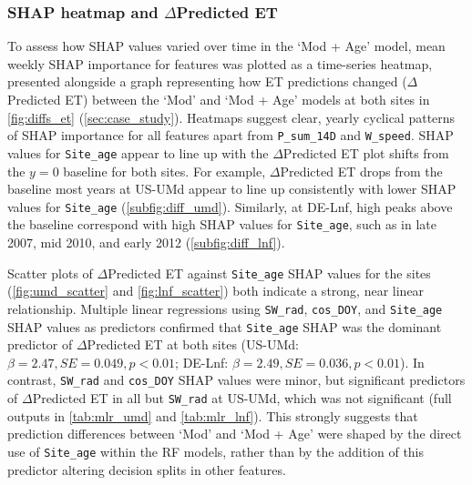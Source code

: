 \subsubsection{SHAP heatmap and $\Delta$Predicted \ac{ET}} \label{case:3}
\par To assess how \ac{SHAP} values varied over time in the `Mod + Age' model, mean weekly \ac{SHAP} importance for features was plotted as a time-series heatmap, presented alongside a graph representing how \ac{ET} predictions changed ($\Delta$Predicted \ac{ET}) between the `Mod' and `Mod + Age' models at both sites in \autoref{fig:diffs_et} (\ref{sec:case_study}). Heatmaps suggest clear, yearly cyclical patterns of \ac{SHAP} importance for all features apart from \texttt{P\_sum\_14D} and \texttt{W\_speed}. \ac{SHAP} values for \texttt{Site\_age} appear to line up with the $\Delta$Predicted \ac{ET} plot shifts from the $y = 0$ baseline for both sites. For example, $\Delta$Predicted \ac{ET} drops from the baseline most years at US-UMd appear to line up consistently with lower \ac{SHAP} values for \texttt{Site\_age} (\autoref{subfig:diff_umd}). Similarly, at DE-Lnf, high peaks above the baseline correspond with high \ac{SHAP} values for \texttt{Site\_age}, such as in late 2007, mid 2010, and early 2012 (\autoref{subfig:diff_lnf}).
\par Scatter plots of $\Delta$Predicted \ac{ET} against \texttt{Site\_age} \ac{SHAP} values for the sites (\autoref{fig:umd_scatter} and \autoref{fig:lnf_scatter}) both indicate a strong, near linear relationship. Multiple linear regressions using \texttt{SW\_rad}, \texttt{cos\_DOY}, and \texttt{Site\_age} \ac{SHAP} values as predictors confirmed that \texttt{Site\_age} \ac{SHAP} was the dominant predictor of $\Delta$Predicted \ac{ET} at both sites (US-UMd: $\beta = 2.47, SE = 0.049, p < 0.01$; DE-Lnf: $\beta = 2.49, SE = 0.036, p < 0.01$). In contrast, \texttt{SW\_rad} and \texttt{cos\_DOY} \ac{SHAP} values were minor, but significant predictors of $\Delta$Predicted \ac{ET} in all but \texttt{SW\_rad} at US-UMd, which was not significant (full outputs in \autoref{tab:mlr_umd} and \autoref{tab:mlr_lnf}). This strongly suggests that prediction differences between `Mod' and `Mod + Age' were shaped by the direct use of \texttt{Site\_age} within the \ac{RF} models, rather than by the addition of this predictor altering decision splits in other features. 

